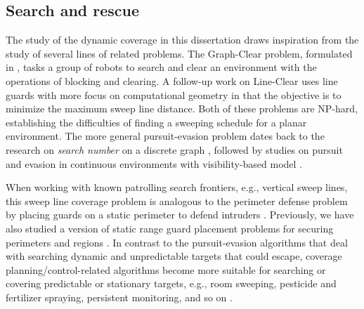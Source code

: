 \subsection{Search and rescue}
The study of the dynamic coverage in this dissertation draws inspiration from the study of several 
lines of related problems. 
The Graph-Clear problem, formulated in \cite{kolling2007graph}, tasks a group of robots to search and clear an environment with the operations of blocking and clearing.
A follow-up work on Line-Clear \cite{kolling2017coordinated} uses line guards
with more focus on computational geometry in that
the objective is to minimize the maximum sweep line distance. Both of these problems are
NP-hard, establishing the difficulties of finding a sweeping schedule for a planar environment.
The more general pursuit-evasion problem dates back to the research on \emph{search number}
on a discrete graph \cite{megiddo1988complexity}, 
followed by studies on pursuit and evasion in continuous environments with 
visibility-based model \cite{guibas1999visibility, suzuki1992searching, lavalle2000algorithm, stiffler2017persistent}. 

When working with known patrolling search frontiers, e.g., vertical sweep lines, 
this sweep line coverage problem is analogous to the perimeter defense problem by placing guards on a static perimeter
to defend intruders \cite{shishika2020cooperative, macharet2020adaptive, chen2021optimal}.
Previously, we have also studied a version of static range guard placement problems for securing perimeters and regions \cite{fengyu2020optimally}.
In contrast to the pursuit-evasion algorithms that deal with searching dynamic and unpredictable targets that could escape, 
coverage planning/control-related algorithms become more suitable for searching or covering predictable or stationary targets,
e.g., room sweeping, pesticide and fertilizer spraying, persistent monitoring, and so on 
\cite{cortes2004coverage, Correia2021icra, oksanen2009coverage, haksar2020spatial, wei2018coverage, deng2019constrained, 
lan2013planning, cassandras2012optimal, yu2015persistent, palacios2017optimal}. 


